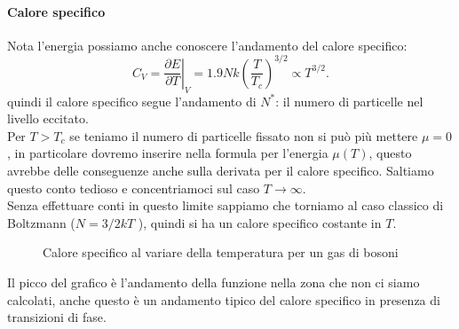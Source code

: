 \paragraph{Calore specifico}
Nota l'energia possiamo anche conoscere l'andamento del calore specifico:
\[
	C_{V}= \left.\frac{\partial E}{\partial T} \right|_{V} = 1.9 Nk \left( \frac{T}{T_{c}} \right) ^{3 /2} \propto T^{3 /2}
.\] 
quindi il calore specifico segue l'andamento di $N^{*}$: il numero di particelle nel livello eccitato. \\
Per $T > T_{c}$ se teniamo il numero di particelle fissato non si può più mettere $\mu = 0$, in particolare dovremo inserire nella formula per l'energia $\mu(T)$, questo avrebbe delle conseguenze anche sulla derivata per il calore specifico. Saltiamo questo conto tedioso e concentriamoci sul caso $T\to \infty$.\\
Senza effettuare conti in questo limite sappiamo che torniamo al caso classico di Boltzmann ($N= 3/2 kT$ ), quindi si ha un calore specifico costante in $T$.
\begin{figure}[H]
    \centering
    \caption{Calore specifico al variare della temperatura per un gas di bosoni}
    \label{fig:calore-specifico-al-variare-della-temperatura-per-un-gas-di-bosoni}
\end{figure}
\noindent
Il picco del grafico è l'andamento della funzione nella zona che non ci siamo calcolati, anche questo è un andamento tipico del calore specifico in presenza di transizioni di fase.\\
